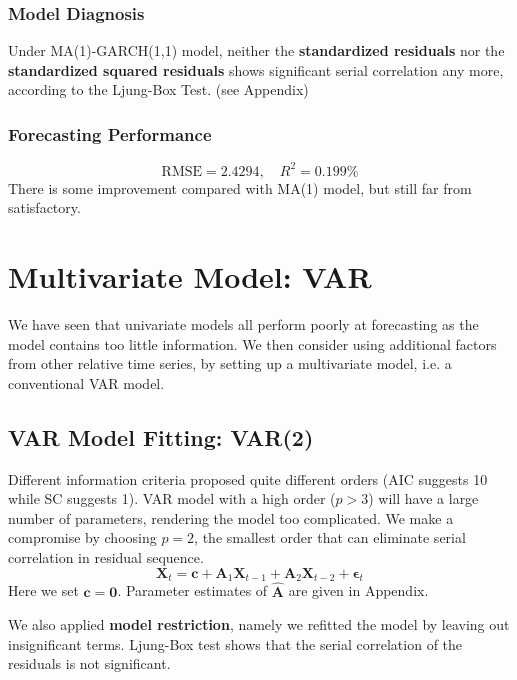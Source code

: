 \documentclass[aps,pre,12pt,preprint,onecolumn,showpacs,showkeys]{revtex4-1}
\begin{document}
        \subsubsection{Model Diagnosis}
            Under MA(1)-GARCH(1,1) model, neither the \textbf{standardized residuals} nor the \textbf{standardized squared residuals} shows significant serial correlation any more, according to the Ljung-Box Test. (see Appendix)
        \subsubsection{Forecasting Performance}
        \begin{equation}
            \mathrm{RMSE}=2.4294,\quad R^2=0.199\%
        \end{equation}
        There is some improvement compared with MA(1) model, but still far from satisfactory.

\section{Multivariate Model: VAR}
    We have seen that univariate models all perform poorly at forecasting as the model contains too little information. We then consider using additional factors from other relative time series, by setting up a multivariate model, i.e. a conventional VAR model.

    \subsection{VAR Model Fitting: VAR(2)}
        Different information criteria proposed quite different orders (AIC suggests 10 while SC suggests 1). VAR model with a high order ($p>3$) will have a large number of parameters, rendering the model too complicated. We make a compromise by choosing $p=2$, the smallest order that can eliminate serial correlation in residual sequence. 
        \begin{equation}
            \bm{X} _t= \bm{c} + \bm {A}_1 \bm {X}_{t-1} +\bm {A}_2 \bm {X}_{t-2} +\bm \epsilon _t
        \end{equation}
        Here we set $\bm c=\bm 0$. Parameter estimates of $\hat {\bm A}$ are given in Appendix.

        We also applied \textbf{model restriction}, namely we refitted the model by leaving out insignificant terms. Ljung-Box test shows that the serial correlation of the residuals is not significant.
\end{document}
